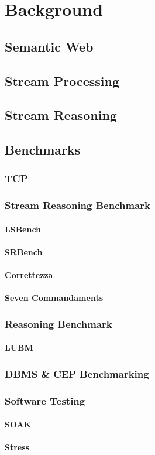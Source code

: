 \chapter{Background}
\section{Semantic Web}
\section{Stream Processing}
\section{Stream Reasoning}
\section{Benchmarks}
\subsection{TCP}
\subsection{Stream Reasoning Benchmark}
\subsubsection{LSBench}
\subsubsection{SRBench}
\subsubsection{Correttezza}
\subsubsection{Seven Commandaments}
\subsection{Reasoning Benchmark}
\subsubsection{LUBM}
\subsection{DBMS \& CEP Benchmarking}
\subsection{Software Testing}
\subsubsection{SOAK}
\subsubsection{Stress}